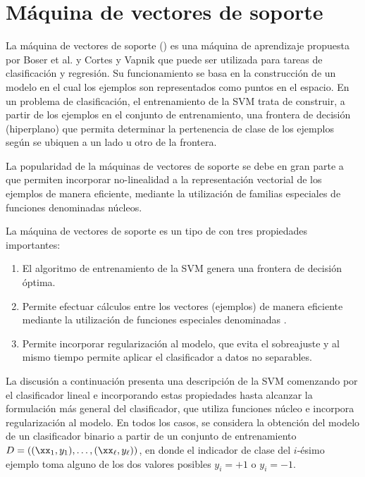 %
%
%
\section{Máquina de vectores de soporte}
%
La máquina de vectores de soporte ()
es una máquina de aprendizaje propuesta por Boser et al. \cite{boser}
y Cortes y Vapnik \cite{svm} que puede ser utilizada para tareas de
clasificación y regresión. Su funcionamiento se basa en la
construcción de un modelo en el cual los ejemplos son representados
como puntos en el espacio. En un problema de clasificación, el
entrenamiento de la SVM trata de construir, a partir de los ejemplos
en el conjunto de entrenamiento, una frontera de decisión (hiperplano)
que permita determinar la pertenencia de clase de los ejemplos según
se ubiquen a un lado u otro de la frontera.

La popularidad de la máquinas de vectores de soporte se debe en gran
parte a que permiten incorporar no-linealidad a la representación
vectorial de los ejemplos de manera eficiente, mediante la utilización
de familias especiales de funciones denominadas núcleos.


La máquina de vectores de soporte es un tipo de  con tres propiedades importantes:
%
\begin{enumerate}
\item El algoritmo de entrenamiento de la SVM genera una frontera de
  decisión óptima.
\item Permite efectuar cálculos entre los vectores (ejemplos) de
  manera eficiente mediante la utilización de funciones especiales
  denominadas .
\item Permite incorporar regularización al modelo, que evita el
  sobreajuste y al mismo tiempo permite aplicar el clasificador a
  datos no separables.
\end{enumerate}
%
La discusión a continuación presenta una descripción de la SVM
comenzando por el clasificador lineal e incorporando estas propiedades
hasta alcanzar la formulación más general del clasificador, que
utiliza funciones núcleo e incorpora regularización al modelo.
En todos los casos, se considera la obtención del modelo de un
clasificador binario a partir de un conjunto de entrenamiento
$D=\left((\xx_1,y_1),\ldots,(\xx_\ell,y_\ell)\right)$, en donde el
indicador de clase del $i$-ésimo ejemplo toma alguno de los dos
valores posibles $y_i=+1$ o $y_i=-1$.
